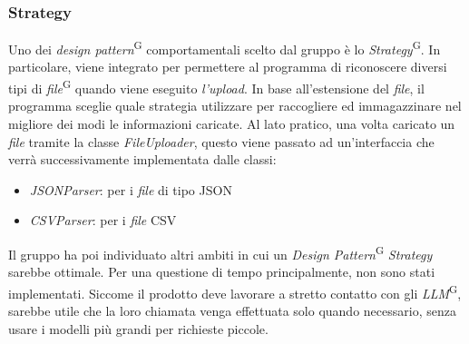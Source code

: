 \documentclass[5pt]{article}
\begin{document}
		\subsubsection{Strategy}
			Uno dei \textit{design pattern}\textsuperscript{G} comportamentali scelto dal gruppo è lo \textit{Strategy}\textsuperscript{G}. 
			In particolare, viene integrato per permettere al programma di riconoscere diversi tipi di \textit{file}\textsuperscript{G} quando viene eseguito \textit{l'upload}. In base all'estensione del \textit{file}, il programma sceglie quale strategia utilizzare per raccogliere ed immagazzinare nel migliore dei modi le informazioni caricate.
			Al lato pratico, una volta caricato un \textit{file} tramite la classe \textit{FileUploader}, questo viene passato ad un'interfaccia che verrà successivamente implementata dalle classi:
			\begin{itemize}
				\item \textit{JSONParser}: per i \textit{file} di tipo JSON
				\item \textit{CSVParser}: per i \textit{file} CSV
			\end{itemize} 
			Il gruppo ha poi individuato altri ambiti in cui un \textit{Design Pattern}\textsuperscript{G} \textit{Strategy} sarebbe ottimale. Per una questione di tempo principalmente, non sono stati implementati. Siccome il prodotto deve lavorare a stretto contatto con gli \textit{LLM}\textsuperscript{G}, sarebbe utile che la loro chiamata venga effettuata solo quando necessario, senza usare i modelli più grandi per richieste piccole.  \\
	
\end{document}

